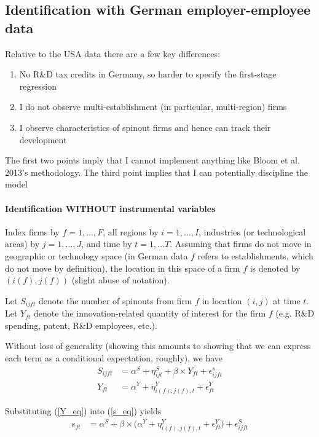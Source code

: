 \documentclass[12pt,english]{article}
\theoremstyle{remark}
\begin{document}
\subsection{Identification with German employer-employee data}

Relative to the USA data there are a few key differences:

\begin{enumerate}
	\item No R\&D tax credits in Germany, so harder to specify the first-stage regression 
	\item I do not observe multi-establishment (in particular, multi-region) firms
	\item I observe characteristics of spinout firms and hence can track their development
\end{enumerate}

The first two points imply that I cannot implement anything like Bloom et al. 2013's methodology. The third point implies that I can potentially discipline the model


\paragraph{Identification WITHOUT instrumental variables}

Index firms by $f = 1,\ldots,F$, all regions by $i=1,\ldots,I$, industries (or technological areas) by $j = 1 , \ldots , J$, and time by $t = 1,\ldots T$. Assuming that firms do not move in geographic or technology space (in German data $f$ refers to establishments, which do not move by definition), the location in this space of a firm $f$ is denoted by $(i(f),j(f))$ (slight abuse of notation). 

Let $S_{ijft}$ denote the number of spinouts from firm $f$ in location $(i,j)$ at time $t$. Let $Y_{ft}$ denote the innovation-related quantity of interest for the firm $f$ (e.g. R\&D spending, patent, R\&D employees, etc.).

Without loss of generality (showing this amounts to showing that we can express each term as a conditional expectation, roughly), we have
\begin{align}
	S_{ijft} &= \alpha^S + \eta_{ijt}^S + \beta \times Y_{ft} + \epsilon_{ijft}^{s} \label{s_eq} \\
	Y_{ft} &= \alpha^Y + \eta^Y_{i(f),j(f),t}  + \epsilon_{ft}^{Y} \label{Y_eq}
\end{align}

Substituting (\ref{Y_eq}) into (\ref{s_eq}) yields
\begin{align}
	s_{ft} &= \alpha^S + \beta \times \Big( \alpha^Y + \eta^Y_{i(f),j(f),t} + \epsilon^Y_{ft} \Big) + \epsilon_{ijft}^{S} \label{s_eq2}
\end{align}
\end{document}
